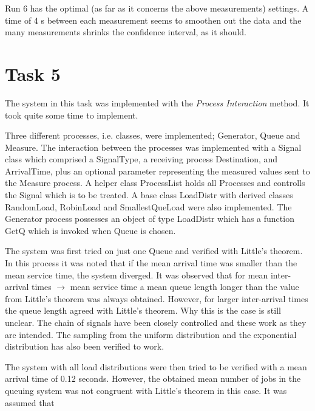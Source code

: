\documentclass[]{article}
\begin{document}
Run 6 has the optimal (as far as it concerns the above measurements) settings.
A time of 4 s between each measurement seems to smoothen out the data and the many measurements shrinks the confidence interval, as it should.

\section{Task 5}
The system in this task was implemented with the {\it Process Interaction} method.
It took quite some time to implement.

Three different processes, i.e. classes, were implemented; Generator, Queue and Measure.
The interaction between the processes was implemented with a Signal class which comprised a SignalType, a receiving process Destination, and ArrivalTime, plus an optional parameter representing the measured values sent to the Measure process.
A helper class ProcessList holds all Processes and controlls the Signal which is to be treated.
A base class LoadDistr with derived classes RandomLoad, RobinLoad and SmallestQueLoad were also implemented.
The Generator process possesses an object of type LoadDistr which has a function GetQ which is invoked when Queue is chosen.

The system was first tried on just one Queue and verified with Little's theorem.
In this process it was noted that if the mean arrival time was smaller than the mean service time, the system diverged.
It was observed that for mean inter-arrival times $\rightarrow$ mean service time a mean queue length longer than the value from Little's theorem was always obtained.
However, for larger inter-arrival times the queue length agreed with Little's theorem.
Why this is the case is still unclear.
The chain of signals have been closely controlled and these work as they are intended.
The sampling from the uniform distribution and the exponential distribution has also been verified to work.

The system with all load distributions were then tried to be verified with a mean arrival time of 0.12 seconds.
However, the obtained mean number of jobs in the queuing system was not congruent with Little's theorem in this case.
It was assumed that
\end{document}
